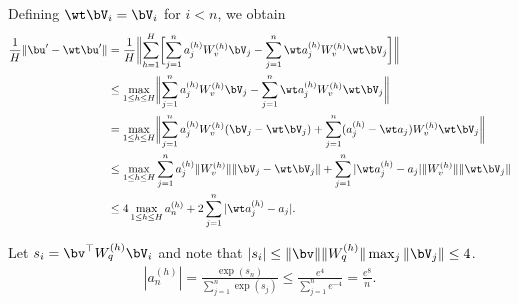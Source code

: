 \documentclass[aspectratio=169,10pt]{beamer}
\newcommand{\currentheading}{\ifx\insertsubsection\empty\insertsection\else\insertsubsection\fi}
\begin{document}
\begin{frame}{\currentheading}
\small
Defining $\wt \bV_i = \bV_i$ for $i < n$, we obtain
\begin{align*}
	 \frac 1 H \|\bu' - \wt \bu'\|
	& = \frac 1 H  \biggl\| \sum_{h = 1}^H \biggl[ \sum_{j = 1}^{n} a_j^{(h)}W_{v}^{(h)} \bV_j - \sum_{j = 1}^{n} \wt a_j^{(h)}W_{v}^{(h)} \wt \bV_j \biggr] \biggr\|                               \\
	& \le   \max_{1 \le h \le H} \biggl\|  \sum_{j = 1}^{n} a_j^{(h)}W_{v}^{(h)} \bV_j - \sum_{j = 1}^{n} \wt a_j^{(h)}W_{v}^{(h)} \wt \bV_j \biggr\| \\
	& = \max_{1 \le h \le H} \biggl\|   \sum_{j = 1}^{n} a_j^{(h)}W_{v}^{(h)} (\bV_j - \wt \bV_j) + \sum_{j = 1}^{n} (a_j^{(h)} - \wt a_{j}) W_{v}^{(h)} \wt \bV_j \biggr\|      \\
	& \le  \max_{1 \le h \le H}\sum_{j = 1}^{n} a_j^{(h)}\|W_{v}^{(h)}\| \|\bV_j - \wt \bV_j\| + \sum_{j = 1}^{n} |\wt a_j^{(h)}-  a_{j}| \| W_{v}^{(h)}\| \| \wt \bV_j\| \\
	& \le 4 \max_{1 \le h \le H}  a_n^{(h)}   + 2 \sum_{j = 1}^{n} |\wt a_j^{(h)}-  a_{j}|.
\end{align*}
\end{frame}

\begin{frame}{\currentheading}
Let $s_{i} = \bv^\top W_{q}^{(h)} \bV_i$ and note that $|s_i| \le \|\bv\| \|W_{q}^{(h)}\| \max_j\|\bV_j\| \le 4$.
\begin{align*}
	|a_n^{(h)}| = \frac{\exp(s_n) }{\sum_{j = 1}^n \exp(s_j)} \le \frac{e^4}{\sum_{j = 1}^n e^{-4}} = \frac{e^8}{n}.
\end{align*}
\end{frame}
\end{document}
